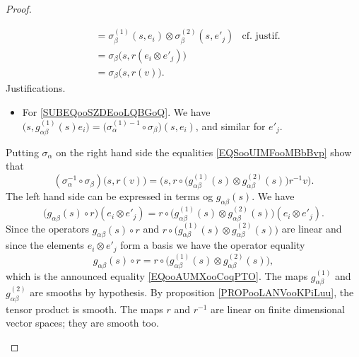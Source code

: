 \begin{proof}
\begin{subproof}
\begin{subproof}
\begin{subequations}
\begin{align}
					 & = \sigma_{\beta}^{(1)}(s,e_i)\otimes \sigma_{\beta}^{(2)}(s,e'_j)                                                                    & \text{cf. justif.}  \label{SUBEQooSZDEooLQBGoQ} \\
					 & =\sigma_{\beta}\big( s,r(e_i\otimes e'_j) \big)                                                                                                                                        \\
					 & =\sigma_{\beta}\big( s,r(v) \big).
				\end{align}
			\end{subequations}
			Justifications.
			\begin{itemize}
				\item
				      For \eqref{SUBEQooSZDEooLQBGoQ}. We have \( \big( s,g_{\alpha\beta}^{(1)}(s)e_i \big)=\big( \sigma_{\alpha}^{(1)-1}\circ \sigma_{\beta} \big)(s,e_i)\), and similar for \( e'_j\).
			\end{itemize}
			Putting \( \sigma_{\alpha}\) on the right hand side the equalities \eqref{EQSooUIMFooMBbBvp} show that
			\begin{equation}
				(\sigma_{\alpha}^{-1}\circ \sigma_{\beta})\big( s,r(v) \big)=\Big( s,r\circ\big( g_{\alpha\beta}^{(1)}(s)\otimes g_{\alpha\beta}^{(2)}(s) \big)r^{-1}v \Big).
			\end{equation}
			The left hand side can be expressed in terms og \( g_{\alpha\beta}(s)\). We have
			\begin{equation}
				\big( g_{\alpha\beta}(s)\circ r \big)(e_i\otimes e'_j)=r\circ \big( g_{\alpha\beta}^{(1)}(s)\otimes g_{\alpha\beta}^{(2)}(s) \big)(e_i\otimes e'_j).
			\end{equation}
			Since the operators \( g_{\alpha\beta}(s)\circ r\) and \( r\circ\big(   g_{\alpha\beta}^{(1)}(s)\otimes g_{\alpha\beta}^{(2)}(s) \big)\) are linear and since the elements \( e_i\otimes e'_j\) form a basis we have the operator equality
			\begin{equation}
				g_{\alpha\beta}(s)\circ r=r\circ \big( g_{\alpha\beta}^{(1)}(s)\otimes g_{\alpha\beta}^{(2)}(s) \big),
			\end{equation}
			which is the announced equality \eqref{EQooAUMXooCoqPTO}.
			\spitem[Conclusion]
			The maps \( g_{\alpha\beta}^(1)\) and \( g_{\alpha\beta}^{(2)}\) are smooths by hypothesis. By proposition \ref{PROPooLANVooKPiLuu}, the tensor product is smooth. The maps \( r\) and \( r^{-1}\) are linear on finite dimensional vector spaces; they are smooth too.
		\end{subproof}
	\end{subproof}
\end{proof}

